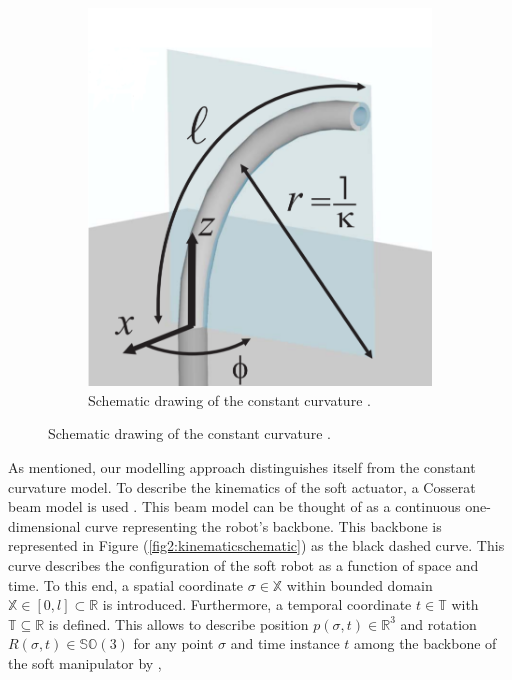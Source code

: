 \begin{figure}[H]
\begin{minipage}{\linewidth}
\begin{minipage}{0.45\linewidth}
\begin{figure}[H]
              \includegraphics[width=\linewidth]{Figures/Chapter2/ccapproach.png}
              \caption{Schematic drawing of the constant curvature \cite{ccapproach}.}
              \label{fig2:ccapproach}
          \end{figure}
      \end{minipage}
  \end{minipage}
\end{figure}

As mentioned, our modelling approach distinguishes itself from the constant curvature model. To describe the kinematics of the soft actuator, a Cosserat beam model is used \cite{Boyer2019}. This beam model can be thought of as a continuous one-dimensional curve representing the robot's backbone. This backbone is represented in Figure (\ref{fig2:kinematicschematic}) as the black dashed curve. This curve describes the configuration of the soft robot as a function of space and time. To this end, a spatial coordinate  $\sigma \in \mathbb{X}$ within bounded domain $\mathbb{X} \in [0,l] \subset \mathbb{R}$ is introduced. Furthermore, a temporal coordinate $t \in  \mathbb{T}$ with $\mathbb{T} \subseteq \mathbb{R}$ is defined. This allows to describe position $p(\sigma,t) \in \mathbb{R}^3$ and rotation $R(\sigma,t) \in \mathbb{SO}(3)$ for any point $\sigma$ and time instance $t$ among the backbone of the soft manipulator by \cite{Caasenbrood2020},


